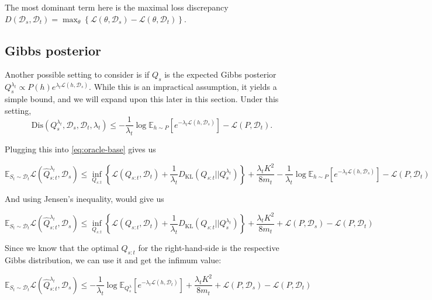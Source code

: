 \documentclass[letterpaper]{article}
\theoremstyle{definition}
\begin{document}
The most dominant term here is the maximal loss discrepancy $D(\mathcal{D}_s, \mathcal{D}_t)=\max_{\theta}\left \{\mathcal{L}(\theta, \mathcal{D}_s)-\mathcal{L}(\theta, \mathcal{D}_t) \right \}$.

\fi


\subsection{Gibbs posterior}

Another possible setting to consider is if $Q_s$ is the expected Gibbs posterior $Q^{\lambda_t}_{s}\propto P(h)e^{\lambda_t\mathcal{L}(h,\mathcal{D}_s)}$.
While this is an impractical assumption, it yields a simple bound, and we will expand upon this later in this section.
Under this setting, $$\mathrm{Dis}(Q^{\lambda_t}_{s},\mathcal{D}_s, \mathcal{D}_t, \lambda_t )\leq -\frac{1}{\lambda_t}\log\mathbb{E}_{h\sim P}\left [e^{-\lambda_t\mathcal{L}(h,\mathcal{D}_s)} \right ]-\mathcal{L}(P,\mathcal{D}_t).$$ 

Plugging this into \eqref{eq:oracle-base} gives us

$$
\mathbb{E}_{S_t\sim \mathcal{D}_t}\mathcal{L}( \hat{Q}^{\lambda_t}_{s:t},\mathcal{D}_s)\leq \inf_{Q_{s:t}}\left \{ \mathcal{L}(Q_{s:t},\mathcal{D}_t) + \frac{1}{\lambda_t}D_{\mathrm{KL}}(Q_{s:t}||Q^{\lambda_t}_{s}) \right \}+\frac{\lambda_t K^2}{8m_t}-\frac{1}{\lambda_t}\log\mathbb{E}_{h\sim P}\left [e^{-\lambda_t\mathcal{L}(h,\mathcal{D}_s)} \right ]-\mathcal{L}(P,\mathcal{D}_t)
$$

And using Jensen's inequality, would give us

\begin{equation}
\mathbb{E}_{S_t\sim \mathcal{D}_t}\mathcal{L}( \hat{Q}^{\lambda_t}_{s:t},\mathcal{D}_s)\leq \inf_{Q_{s:t}}\left \{ \mathcal{L}(Q_{s:t},\mathcal{D}_t) + \frac{1}{\lambda_t}D_{\mathrm{KL}}(Q_{s:t}||Q^{\lambda_t}_{s}) \right \}+\frac{\lambda_t K^2}{8m_t}+\mathcal{L}(P,\mathcal{D}_s)-\mathcal{L}(P,\mathcal{D}_t)
\end{equation}

Since we know that the optimal $Q_{s:t}$ for the right-hand-side is the respective Gibbs distribution, we can use it and get the infimum value:

\begin{equation*}
\mathbb{E}_{S_t\sim \mathcal{D}_t}\mathcal{L}( \hat{Q}^{\lambda_t}_{s:t},\mathcal{D}_s)\leq -\frac{1}{\lambda_t}\log \mathbb{E}_{Q^\lambda_s}\left [e^{-\lambda_t\mathcal{L}(h,\mathcal{D}_t)}\right ] +\frac{\lambda_t K^2}{8m_t}+\mathcal{L}(P,\mathcal{D}_s)-\mathcal{L}(P,\mathcal{D}_t)
\end{equation*}
\end{document}
